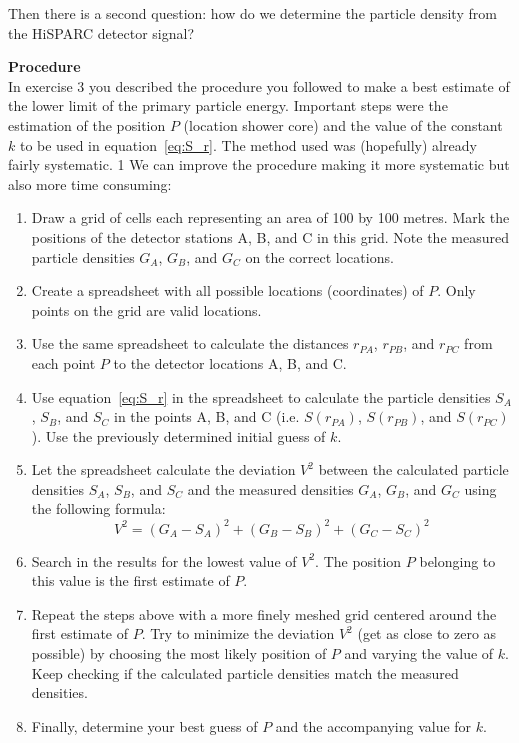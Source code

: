 Then there is a second question: how do we determine the particle density from the HiSPARC detector signal? 

\begin{shaded}
\noindent \textbf{Procedure}
\\ \indent In exercise 3 you described the procedure you followed to make a best estimate of the lower limit of the primary particle energy. Important steps were the estimation of the position $P$ (location shower core) and the value of the constant $k$ to be used in equation~\ref{eq:S_r}. The method used was (hopefully) already fairly systematic.
1
We can improve the procedure making it more systematic but also more time consuming:
\begin{enumerate}[-]
\item Draw a grid of cells each representing an area of 100 by 100 metres. Mark the positions of the detector stations A, B, and C in this grid. Note the measured particle densities $G_A$, $G_B$, and $G_C$ on the correct locations.
\item Create a spreadsheet with all possible locations (coordinates) of $P$. Only points on the grid are valid locations.
\item Use the same spreadsheet to calculate the distances $r_{PA}$, $r_{PB}$, and $r_{PC}$ from each point $P$ to the detector locations A, B, and C. 
\item Use equation~\ref{eq:S_r} in the spreadsheet to calculate the particle densities $S_A$, $S_B$, and $S_C$ in the points A, B, and C (i.e. $S(r_{PA})$, $S(r_{PB})$, and $S(r_{PC})$). Use the previously determined initial guess of $k$.
\item Let the spreadsheet calculate the deviation $V^2$ between the calculated particle densities $S_A$, $S_B$, and $S_C$ and the measured densities $G_A$, $G_B$, and $G_C$ using the following formula:
\begin{equation}
V^2 = \left( G_A - S_A \right)^2 + \left( G_B - S_B \right)^2 + \left( G_C - S_C \right)^2
\end{equation}
\item Search in the results for the lowest value of $V^2$. The position $P$ belonging to this value is the first estimate of $P$.
\item Repeat the steps above with a more finely meshed grid centered around the first estimate of $P$. Try to minimize the deviation $V^2$ (get as close to zero as possible) by choosing the most likely position of $P$ and varying the value of $k$. Keep checking if the calculated particle densities match the measured densities.
\item Finally, determine your best guess of $P$ and the accompanying value for $k$.
\end{enumerate}
\end{shaded} 

